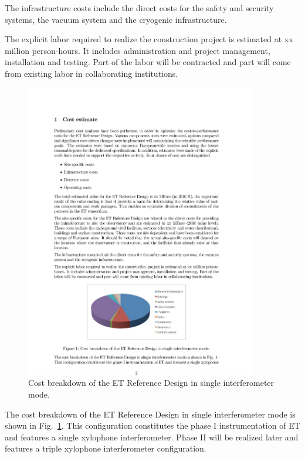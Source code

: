 The infrastructure costs include the direct costs for the
safety and security systems, the vacuum system and the cryogenic infrastructure.

The explicit labor required to realize the construction project is estimated at
xx million person-hours. It includes administration and project management,
installation and testing. Part of the labor will be contracted and part will come from
existing labor in collaborating institutions.

\begin{figure}[htbp!]
	\begin{center}
		\includegraphics[width=10cm]{./Sec_SiteInfra/Figures/ETcost1.pdf}
		\caption{Cost breakdown of the ET Reference Design in single interferometer mode.}
		\label{fig:etcost1}
	\end{center}
\end{figure}
The cost breakdown of the ET Reference Design in single interferometer mode
is shown in Fig.~\ref{fig:etcost1}. This configuration constitutes the phase I instrumentation
of ET and features a single xylophone interferometer. Phase II will be realized later
and features a triple xylophone interferometer configuration.


